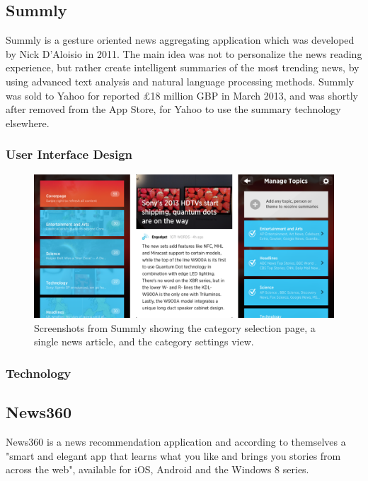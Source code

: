 \subsection{Summly}

Summly is a gesture oriented news aggregating application which was developed by Nick D'Aloisio in 2011. The main idea was not to personalize the news reading experience, but rather create intelligent summaries of the most trending news, by using advanced text analysis and natural language processing methods. Summly was sold to Yahoo for reported £18 million GBP in March 2013\cite{summly_sold_yahoo}, and was shortly after removed from the App Store, for Yahoo to use the summary technology elsewhere\cite{summly_closed}.

\subsubsection{User Interface Design}

\begin{figure}[!htbp]
\centering
\includegraphics[width=130mm]{GFX/screenshots/summly.png}
\caption{Screenshots from Summly showing the category selection page, a single news article, and the category settings view.}
\label{screenshots_summly}
\end{figure}

\subsubsection{Technology}


\subsection{News360}

News360 is a news recommendation application and according to themselves a "smart and elegant app that learns what you like and brings you stories from across the web"\cite{news360_about}, available for iOS, Android and the Windows 8 series.

